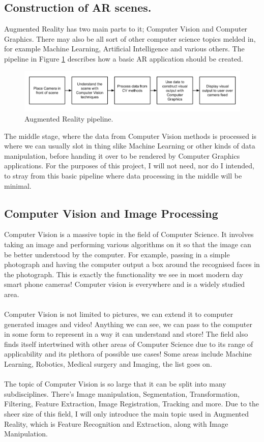 \documentclass[11pt]{article}
\begin{document}
\subsection{Construction of AR scenes.}
Augmented Reality has two main parts to it; Computer Vision and Computer Graphics.
There may also be all sort of other computer science topics melded in, for
example Machine Learning, Artificial Intelligence and various others. 
The pipeline in Figure \ref{fig:arpipeline} describes how a basic AR 
application should be created.\\

\begin{figure} 
	\includegraphics[scale=0.5]{pics/ARpipeline}
	\caption{Augmented Reality pipeline.}
	\label{fig:arpipeline}
\end{figure}

The middle stage, where the data from Computer Vision methods is processed
is where we can usually slot in thing slike Machine Learning or other kinds
of data manipulation, before handing it over to be rendered by Computer
Graphics applications. For the purposes of this project, I will not need,
nor do I intended, to stray from this basic pipeline where data processing in 
the middle will be minimal.

\subsection{Computer Vision and Image Processing}
Computer Vision is a massive topic in the field of Computer Science. It
involves taking an image and performing various algorithms on it so that
the image can be better understood by the computer. For example,
passing in a simple photograph and having the computer output a box
around the recognised faces in the photograph. This is exactly the
functionality we see in most modern day smart phone cameras! Computer
vision is everywhere and is a widely studied area.\\
\\
Computer Vision is not limited to pictures, we can extend it to 
computer generated images and video! Anything we can see, we can pass to 
the computer in some form to represent in a way it can understand and
store! The field also finds itself intertwined with other areas of
Computer Science due to its range of applicability and its plethora
of possible use cases! Some areas include Machine Learning, Robotics,
Medical surgery and Imaging, the list goes on.\\
\\
The topic of Computer Vision is so large that it can be split into
many subdisciplines. There's Image manipulation, Segmentation, 
Transformation, Filtering, Feature Extraction, Image Registration,
Tracking and more. Due to the sheer size of this field, I will only 
introduce the main topic used in Augmented Reality, which is Feature 
Recognition and Extraction, along with Image Manipulation.
\end{document}
